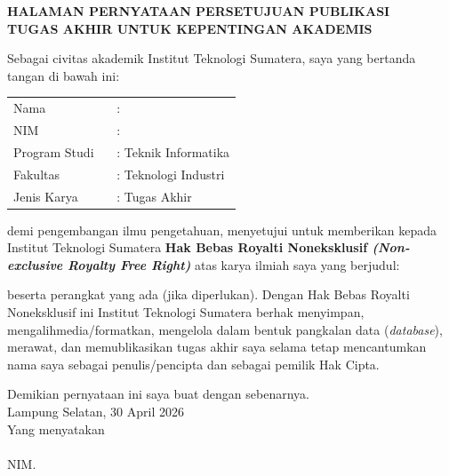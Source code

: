\clearpage
{}%

\begin{center}
	\smallskip
	
	\normalsize \bfseries \MakeUppercase{
		HALAMAN PERNYATAAN PERSETUJUAN PUBLIKASI \\
		TUGAS AKHIR UNTUK KEPENTINGAN AKADEMIS
	}\linebreak
	
	\normalfont \onehalfspacing \justifying %
	Sebagai civitas akademik Institut Teknologi Sumatera, saya yang bertanda tangan di bawah ini:
	
	\flushleft
	\setlength{\tabcolsep}{0pt}
	\begin{tabular}{l l}
		Nama 			&  : \theauthor\\
		NIM 			&  : \printnim\\
		Program Studi \	&  : Teknik Informatika\\
		Fakultas 		&  : Teknologi Industri\\
		Jenis Karya 	&  : Tugas Akhir\\
	\end{tabular}

	\justifying
	\noindent demi pengembangan ilmu pengetahuan, menyetujui untuk memberikan kepada Institut Teknologi Sumatera \textbf{Hak Bebas Royalti Noneksklusif \textit{(Non-exclusive Royalty Free Right)}} atas karya ilmiah saya yang berjudul:
	
	\centering
	\textbf{\thetitle}
	
	\justifying
	beserta perangkat yang ada (jika diperlukan). Dengan Hak Bebas Royalti Noneksklusif ini Institut Teknologi Sumatera berhak menyimpan, mengalihmedia/formatkan, mengelola dalam bentuk pangkalan data (\textit{database}), merawat, dan memublikasikan tugas akhir saya selama tetap mencantumkan nama saya sebagai penulis/pencipta dan sebagai pemilik Hak Cipta.
	
	Demikian pernyataan ini saya buat dengan sebenarnya. \\
	
	\centering
	Lampung Selatan, 30 April 2026\\
	\bigskip
	Yang menyatakan\\
	\vspace{1.5cm}
	\theauthor\\
	NIM. \printnim\\
	
\end{center}
\clearpage
\null
\thispagestyle{empty}
\newpage
\clearpage